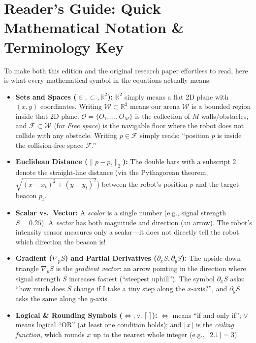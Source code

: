\documentclass[11pt, a4paper]{article}
\begin{document}
\section*{Reader's Guide: Quick Mathematical Notation \& Terminology Key}
To make both this edition and the original research paper effortless to read, here is what every mathematical symbol in the equations actually means:
\begin{itemize}
    \item \textbf{Sets and Spaces ($\in, \subset, \mathbb{R}^2$):} $\mathbb{R}^2$ simply means a flat 2D plane with $(x, y)$ coordinates. Writing $\mathcal{W} \subset \mathbb{R}^2$ means our arena $\mathcal{W}$ is a bounded region inside that 2D plane. $\mathcal{O} = \{O_1, \dots, O_M\}$ is the collection of $M$ walls/obstacles, and $\mathcal{F} \subset \mathcal{W}$ (for \textit{Free space}) is the navigable floor where the robot does not collide with any obstacle. Writing $p \in \mathcal{F}$ simply reads: ``position $p$ is inside the collision-free space $\mathcal{F}$.''
    \item \textbf{Euclidean Distance ($\|p - p_t\|_2$):} The double bars with a subscript $2$ denote the straight-line distance (via the Pythagorean theorem, $\sqrt{(x-x_t)^2 + (y-y_t)^2}$) between the robot's position $p$ and the target beacon $p_t$.
    \item \textbf{Scalar vs.\ Vector:} A \textit{scalar} is a single number (e.g., signal strength $S = 0.25$). A \textit{vector} has both magnitude and direction (an arrow). The robot's intensity sensor measures only a scalar—it does not directly tell the robot which direction the beacon is!
    \item \textbf{Gradient ($\nabla_p S$) and Partial Derivatives ($\partial_x S, \partial_y S$):} The upside-down triangle $\nabla_p S$ is the \textit{gradient vector}: an arrow pointing in the direction where signal strength $S$ increases fastest (``steepest uphill''). The symbol $\partial_x S$ asks: ``how much does $S$ change if I take a tiny step along the $x$-axis?'', and $\partial_y S$ asks the same along the $y$-axis.
    \item \textbf{Logical \& Rounding Symbols ($\iff, \lor, \lceil \cdot \rceil$):} $\iff$ means ``if and only if''; $\lor$ means logical ``OR'' (at least one condition holds); and $\lceil x \rceil$ is the \textit{ceiling function}, which rounds $x$ up to the nearest whole integer (e.g., $\lceil 2.1 \rceil = 3$).
\end{itemize}
\end{document}
